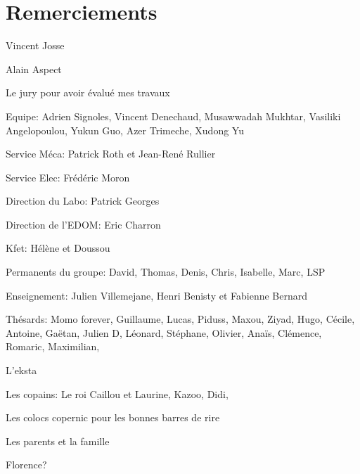 \chapter*{Remerciements}

Vincent Josse

Alain Aspect

Le jury pour avoir évalué mes travaux

Equipe: Adrien Signoles, Vincent Denechaud, Musawwadah Mukhtar, Vasiliki Angelopoulou, Yukun Guo, Azer Trimeche, Xudong Yu

Service Méca: Patrick Roth et Jean-René Rullier

Service Elec: Frédéric Moron

Direction du Labo: Patrick Georges

Direction de l'EDOM: Eric Charron

Kfet: Hélène et Doussou

Permanents du groupe: David, Thomas, Denis, Chris, Isabelle, Marc, LSP

Enseignement: Julien Villemejane, Henri Benisty et Fabienne Bernard

Thésards: Momo forever, Guillaume, Lucas, Piduss, Maxou, Ziyad, Hugo, Cécile, Antoine, Gaëtan, Julien D, Léonard, Stéphane, Olivier, Anaïs, Clémence, Romaric, Maximilian, 

L'eksta

Les copains: Le roi Caillou et Laurine, Kazoo, Didi, 

Les colocs copernic pour les bonnes barres de rire

Les parents et la famille

Florence?


